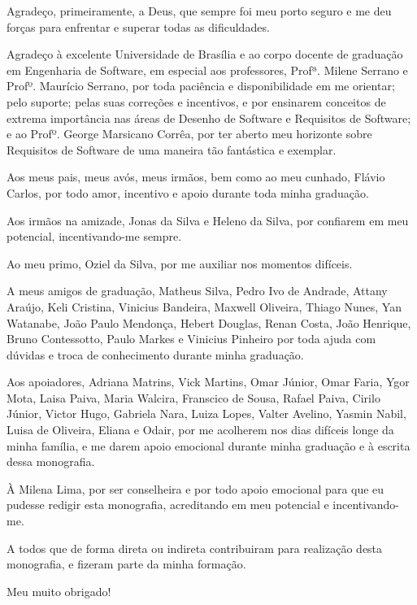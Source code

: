 \begin{agradecimentos}

	Agradeço, primeiramente, a Deus, que sempre foi meu porto seguro e me deu forças para enfrentar e superar todas as dificuldades.
	 
	Agradeço à excelente Universidade de Brasília e ao corpo docente de graduação em Engenharia de Software, em especial aos professores, Profª. Milene Serrano e Profº. Maurício Serrano, por toda paciência e disponibilidade em me orientar; pelo suporte; pelas suas correções e incentivos, e por ensinarem conceitos de extrema importância nas áreas de Desenho de Software e Requisitos de Software; e ao Profº. George Marsicano Corrêa, por ter aberto meu horizonte sobre Requisitos de Software de uma maneira tão fantástica e exemplar.
	
	Aos meus pais, meus avós, meus irmãos, bem como ao meu cunhado, Flávio Carlos, por todo amor, incentivo e apoio durante toda minha graduação. 
	
	Aos irmãos na amizade, Jonas da Silva e Heleno da Silva, por confiarem em meu potencial, incentivando-me sempre. 
	
	Ao meu primo, Oziel da Silva, por me auxiliar nos momentos difíceis. 
	
	A meus amigos de graduação, Matheus Silva, Pedro Ivo de Andrade, Attany Araújo, Keli Cristina, Vinicius Bandeira, Maxwell Oliveira, Thiago Nunes, Yan Watanabe, João Paulo Mendonça, Hebert Douglas, Renan Costa, João Henrique, Bruno Contessotto, Paulo Markes e Vinicius Pinheiro por toda ajuda com dúvidas e troca de conhecimento durante minha graduação. 
	
	Aos apoiadores, Adriana Matrins, Vick Martins, Omar Júnior, Omar Faria, Ygor Mota, Laisa Paiva, Maria Walcira, Franscico de Sousa, Rafael Paiva, Cirilo Júnior, Victor Hugo, Gabriela Nara, Luiza Lopes, Valter Avelino, Yasmin Nabil, Luisa de Oliveira, Eliana e Odair,  por me acolherem nos dias difíceis longe da minha família,  e me darem apoio emocional durante minha graduação e à escrita dessa monografia. 
	
	À Milena Lima, por ser conselheira e por todo apoio emocional para que eu pudesse redigir esta monografia, acreditando em meu potencial e incentivando-me.
	
	A todos que de forma direta ou indireta contribuiram para realização desta monografia, e fizeram parte da minha formação. 
	
	Meu muito obrigado!  
	
\end{agradecimentos}
